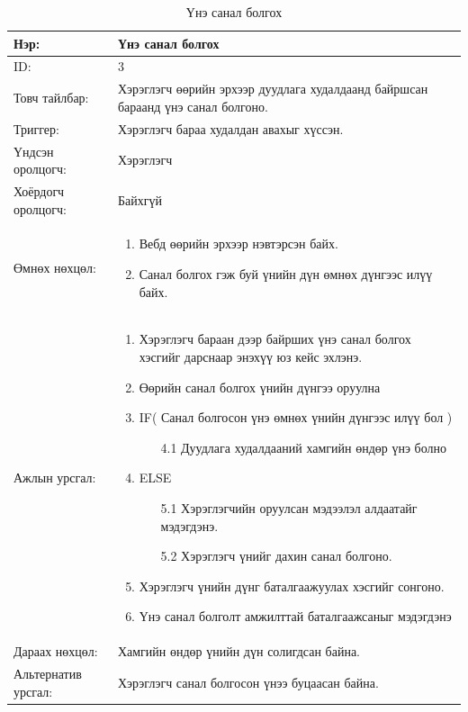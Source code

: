 \begin{center}
	\begin{table}[!htbp]
		\caption{Үнэ санал болгох}
		\begin{tabular}{|p{4cm}|p{11cm}|}
			\hline
			Нэр: & Үнэ санал болгох \\
			\hline
			ID: & 3 \\
			\hline
			Товч тайлбар: & Хэрэглэгч өөрийн эрхээр дуудлага худалдаанд байршсан бараанд үнэ санал болгоно.  \\
			\hline
			Триггер: & Хэрэглэгч бараа худалдан авахыг хүссэн. \\
			\hline
			Үндсэн оролцогч: & Хэрэглэгч \\
			\hline
			Хоёрдогч оролцогч: & Байхгүй  \\
			\hline
			Өмнөх нөхцөл: &  \begin{enumerate}
				\item Вебд  өөрийн эрхээр нэвтэрсэн байх.
				\item Санал болгох гэж буй үнийн дүн өмнөх дүнгээс илүү байх.
			\end{enumerate}
			\\			\hline
			Ажлын урсгал: & \begin{enumerate}
								\item Хэрэглэгч бараан дээр байрших үнэ санал болгох хэсгийг дарснаар энэхүү юз кейс эхлэнэ.
								\item Өөрийн санал болгох үнийн дүнгээ оруулна
								\item IF( Санал болгосон үнэ өмнөх үнийн дүнгээс илүү бол )
									\begin{enumerate}
										\item[4.1] Дуудлага худалдааний хамгийн өндөр үнэ болно
									\end{enumerate}
								\item ELSE 
									\begin{enumerate}
										\item[5.1] Хэрэглэгчийн оруулсан мэдээлэл алдаатайг мэдэгдэнэ.
										\item[5.2] Хэрэглэгч үнийг дахин санал болгоно.
									\end{enumerate}
								\item Хэрэглэгч үнийн дүнг баталгаажуулах хэсгийг сонгоно.
								\item Үнэ санал болголт амжилттай баталгаажсаныг мэдэгдэнэ
							\end{enumerate}
\\						\hline
			Дараах нөхцөл: & Хамгийн өндөр үнийн дүн солигдсан байна. \\
			\hline
			Альтернатив урсгал: & Хэрэглэгч санал болгосон үнээ буцаасан байна. \\
			\hline
		\end{tabular}
	\end{table}
\end{center}




